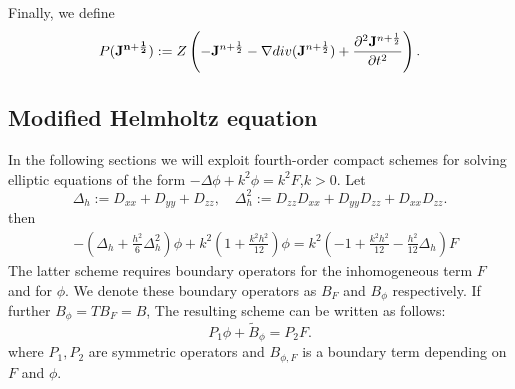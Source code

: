 \documentclass[12pt,reqno]{amsart}
\newtheorem{proposition}[theorem]{Proposition}
\theoremstyle{definition}
\numberwithin{equation}{section}
\begin{document}


	
	Finally, we define 
	$$
	P({\bf J^{n+\frac{1}{2}}}):=Z\left ( -{\bf J}^{n+\frac{1}{2}}-\nabla div({\bf J}^{n+\frac{1}{2}})+\frac{\partial^2{\bf J}^{n+\frac{1}{2}}}{\partial t^2}\right ).
	$$
   \subsection{Modified Helmholtz equation}
   In the following sections we will exploit fourth-order compact schemes for solving elliptic equations of the form $-\Delta \phi+k^2\phi=k^2F$,$k>0$.
Let 
$$
\Delta_h:=D_{xx}+D_{yy}+D_{zz}, \quad \Delta^2_h:= D_{zz}D_{xx}+D_{yy}D_{zz}+D_{xx}D_{zz}.
$$
then 
\begin{align*}
	&
	-\left (
	\Delta_h+\frac{h^2}{6}\Delta^2_h
	\right)\phi+
	k^2\left (
	1+\frac{k^2h^2}{12}
	\right)\phi=
	k^2\left (
	-1+\frac{k^2h^2}{12}
	-\frac{h^2}{12}\Delta_h
	\right)F
\end{align*}
The latter scheme requires boundary operators for the inhomogeneous term $F$ and for $\phi$. We denote these boundary operators as 
$B_{F}$ and $B_{\phi}$ respectively.
If further $B_{\phi}=TB_{F}=B$, 
The resulting scheme can be written as follows:
$$
P_1\phi+\tilde{B}_{\phi}=P_2F.
$$
where $P_1,P_2$ are symmetric operators and $B_{\phi,F}$ is a boundary term depending on $F$ and $\phi$.
   
\end{document}
